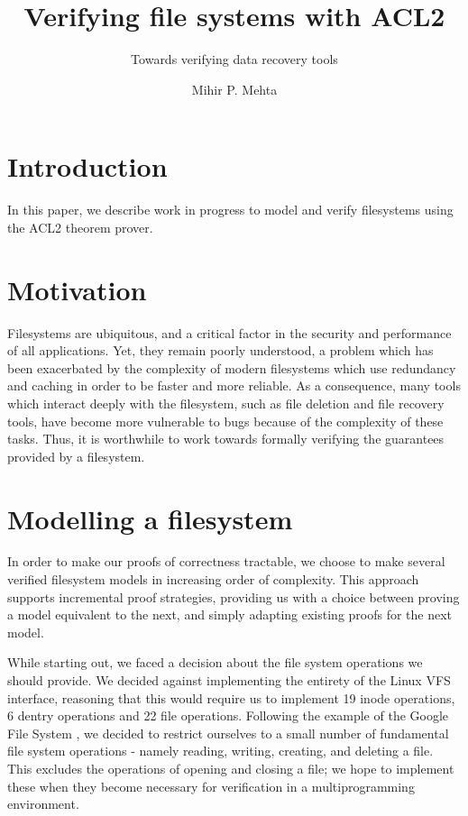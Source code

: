 \documentclass[format=sigconf,review=true]{acmart}
\title{Verifying file systems with ACL2}
\subtitle{Towards verifying data recovery tools}
\author{Mihir P. Mehta}
\affiliation{%
  \institution{University of Texas at Austin}
  \city{Austin}
  \state{TX}
  \country{USA}}
\begin{document}
\lstset{language=Lisp}

\maketitle

\section{Introduction}

In this paper, we describe work in progress to model and verify
filesystems using the ACL2 theorem prover.

\section{Motivation}
Filesystems are ubiquitous, and a critical factor in the security and
performance of all applications. Yet, they remain poorly understood,
a problem which has been exacerbated by the complexity of modern
filesystems which use redundancy and caching in order to be faster and
more reliable. As a consequence, many tools which interact deeply with
the filesystem, such as file deletion and file recovery tools, have
become more vulnerable to bugs because of the complexity of these
tasks. Thus, it is worthwhile to work towards formally verifying the
guarantees provided by a filesystem.

\section{Modelling a filesystem}

In order to make our proofs of correctness tractable, we choose to
make several verified filesystem models in increasing order of
complexity. This approach supports incremental proof strategies,
providing us with a choice between proving a model equivalent to the
next, and simply adapting existing proofs for the next model.

While starting out, we faced a decision about the file system
operations we should provide. We decided against implementing the
entirety of the Linux VFS interface, reasoning that this would require
us to implement 19 inode operations, 6 dentry operations and 22 file
operations. Following the  example of the Google File System
\cite{Ghemawat:2003:GFS:945445.945450}, we decided to restrict ourselves to a small
number of fundamental file system operations - namely reading, writing,
creating, and deleting a file. This excludes the operations of opening
and closing a file; we hope to implement these when they become
necessary for verification in a multiprogramming environment.
\end{document}
